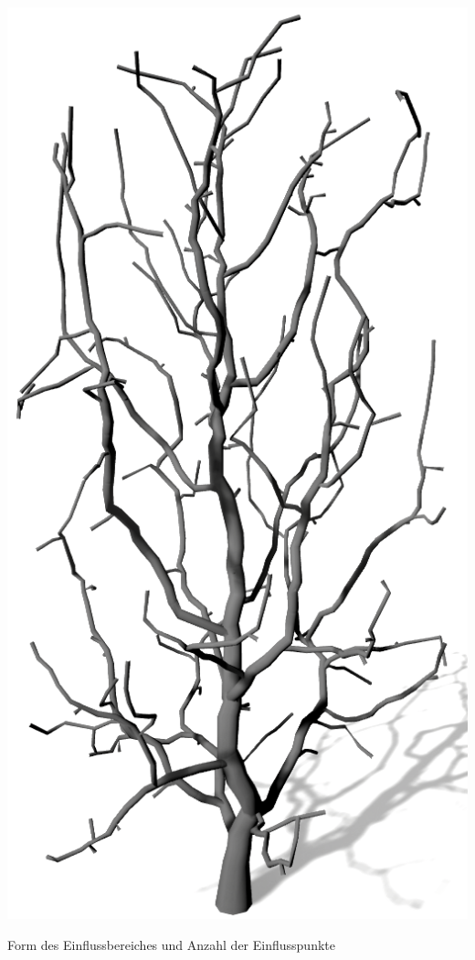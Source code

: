 \begin{center}
\begin{minipage}[c]{0.45\textwidth}
	\end{minipage}
	\hspace{.05\textwidth}	
	\begin{minipage}[c]{0.45\textwidth}
		\centering
		\includegraphics[height=.9\textheight]{images/SCA_Einfluss_Cylinder_Low}
	\end{minipage}
	\vspace{0.05\textheight}

	Form des Einflussbereiches und Anzahl der Einflusspunkte
\end{center}






